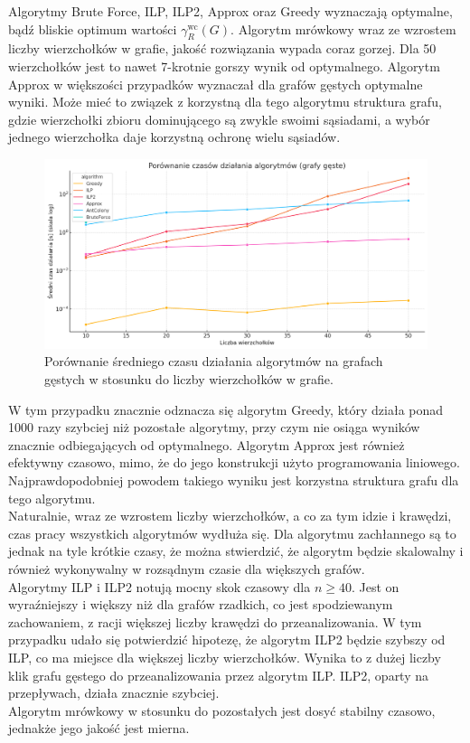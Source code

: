     Algorytmy Brute Force, ILP, ILP2, Approx oraz Greedy wyznaczają optymalne, bądź bliskie optimum wartości $\gamma^{\text{wc}}_R(G)$. Algorytm mrówkowy wraz ze wzrostem liczby wierzchołków w grafie, jakość rozwiązania wypada coraz gorzej. Dla 50 wierzchołków jest to nawet 7-krotnie gorszy wynik od optymalnego. Algorytm Approx w większości przypadków wyznaczał dla grafów gęstych optymalne wyniki. Może mieć to związek z korzystną dla tego algorytmu struktura grafu, gdzie wierzchołki zbioru dominującego są zwykle swoimi sąsiadami, a wybór jednego wierzchołka daje korzystną ochronę wielu sąsiadów.

    \begin{figure}[H]
        \centering
        \includegraphics[width=\textwidth]{assets/dense.png}
        \caption{Porównanie średniego czasu działania algorytmów na grafach gęstych w stosunku do liczby wierzchołków w grafie.}
        \label{fig:densePlot}
    \end{figure}

    W tym przypadku znacznie odznacza się algorytm Greedy, który działa ponad 1000 razy szybciej niż pozostałe algorytmy, przy czym nie osiąga wyników znacznie odbiegających od optymalnego. Algorytm Approx jest również efektywny czasowo, mimo, że do jego konstrukcji użyto programowania liniowego. Najprawdopodobniej powodem takiego wyniku jest korzystna struktura grafu dla tego algorytmu.\\
    Naturalnie, wraz ze wzrostem liczby wierzchołków, a co za tym idzie i krawędzi, czas pracy wszystkich algorytmów wydłuża się. Dla algorytmu zachłannego są to jednak na tyle krótkie czasy, że można stwierdzić, że algorytm będzie skalowalny i również wykonywalny w rozsądnym czasie dla większych grafów.\\
    Algorytmy ILP i ILP2 notują mocny skok czasowy dla $n \geq 40 $. Jest on wyraźniejszy i większy niż dla grafów rzadkich, co jest spodziewanym zachowaniem, z racji większej liczby krawędzi do przeanalizowania. W tym przypadku udało się potwierdzić hipotezę, że algorytm ILP2 będzie szybszy od ILP, co ma miejsce dla większej liczby wierzchołków. Wynika to z dużej liczby klik grafu gęstego do przeanalizowania przez algorytm ILP. ILP2, oparty na przepływach, działa znacznie szybciej. \\
    Algorytm mrówkowy w stosunku do pozostałych jest dosyć stabilny czasowo, jednakże jego jakość jest mierna.\\
    
